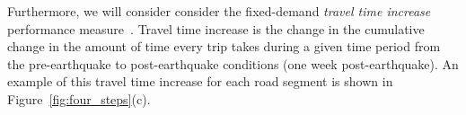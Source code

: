 Furthermore, we will consider consider the fixed-demand \emph{travel time increase} performance measure~\cite[e.g.,][]{stergiou_treatment_2006,shiraki_system_2007,jayaram_efficient_2010,han_probabilistic_2012}. Travel time increase is the change in the cumulative change in the amount of time every trip takes during a given time period from the pre-earthquake to post-earthquake conditions (one week post-earthquake). An example of this travel time increase for each road segment is shown in Figure~\ref{fig:four_steps}{(c)}.

%
%
%
%
%
